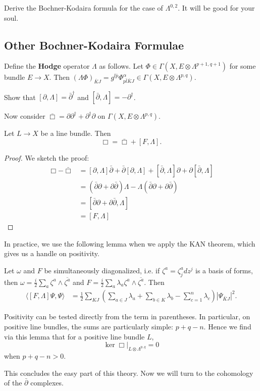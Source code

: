 \documentclass{../mathnotes}
\begin{document}
\begin{exc}
    Derive the Bochner-Kodaira formula for the case of $\Lambda^{0,2}$. It will be good for your soul.
\end{exc}

\subsection{Other Bochner-Kodaira Formulae}

\begin{defn}
    Define the \textbf{Hodge} operator $\Lambda$ as follows.
    Let $\Phi\in\Gamma(X,E\otimes\Lambda^{p+1,q+1})$ for some
    bundle $E\to X$. Then $(\Lambda\Phi)_{\bar KJ}=g^{l\bar p}\Phi^\alpha_{p\bar l\bar KJ}\in\Gamma(X,E\otimes\Lambda^{p,q})$.
\end{defn}

\begin{exc}
    Show that $[\partial,\Lambda]=\bar\partial^\dagger$ and $[\bar\partial,\Lambda]=-\partial^\dagger$.
\end{exc}

Now consider $\bar\Box=\partial\partial^\dagger+\partial^\dagger\partial$ on $\Gamma(X,E\otimes\Lambda^{p,q})$.
\begin{thm}
    Let $L\to X$ be a line bundle. Then
    \[\Box=\bar\Box+[F,\Lambda].\]
\end{thm}
\begin{proof}
    We sketch the proof: 
    \begin{align*}
        \Box-\bar\Box&=[\partial,\Lambda]\bar\partial+\bar\partial[\partial,\Lambda]+[\bar\partial,\Lambda]\partial+\partial[\bar\partial,\Lambda]\\
        &=(\bar\partial\partial+\partial\bar\partial)\Lambda-\Lambda(\bar\partial\partial+\partial\bar\partial)\\
        &=[\bar\partial\partial+\partial\bar\partial,\Lambda]\\
        &=[F,\Lambda]
    \end{align*}
\end{proof}

In practice, we use the following lemma when we apply the KAN theorem, which gives us a handle on positivity.
\begin{lem}
    Let $\omega$ and $F$ be simultaneously diagonalized, i.e. if $\zeta^a=\zeta^a_j dz^j$ is a basis of forms, then
    $\omega=\frac{i}{2}\sum_a\zeta^a\wedge\overline{\zeta^a}$ and $F=\frac{i}{2}\sum_a\lambda_a\zeta^a\wedge\overline{\zeta^a}$.
    Then
    \begin{align*}
        \langle[F,\Lambda]\Psi,\Psi\rangle&=\frac{1}{2}\sum_{KJ}\left(\sum_{a\in J}\lambda_a+\sum_{b\in K}\lambda_b-\sum_{c=1}^n\lambda_c\right)|\Psi_{\bar KJ}|^2.
    \end{align*}
\end{lem}
Positivity can be tested directly from the term in parentheses. In particular, on positive line bundles, the sums are particularly simple: $p+q-n$.
Hence we find via this lemma that for a positive line bundle $L$,
\[\ker\Box\bigg|_{L\otimes\Lambda^{p,q}}=0\]
when $p+q-n>0$.

This concludes the easy part of this theory. Now we will turn to the cohomology of the $\bar\partial$ complexes.
\end{document}
